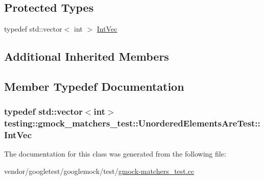 \subsection*{Protected Types}
\begin{DoxyCompactItemize}
\item 
typedef std\+::vector$<$ int $>$ \hyperlink{classtesting_1_1gmock__matchers__test_1_1UnorderedElementsAreTest_a608750c71652943bd11fe7bb5281588d}{Int\+Vec}
\end{DoxyCompactItemize}
\subsection*{Additional Inherited Members}


\subsection{Member Typedef Documentation}
\subsubsection[{\texorpdfstring{Int\+Vec}{IntVec}}]{\setlength{\rightskip}{0pt plus 5cm}typedef std\+::vector$<$int$>$ {\bf testing\+::gmock\+\_\+matchers\+\_\+test\+::\+Unordered\+Elements\+Are\+Test\+::\+Int\+Vec}\hspace{0.3cm}{\ttfamily [protected]}}\hypertarget{classtesting_1_1gmock__matchers__test_1_1UnorderedElementsAreTest_a608750c71652943bd11fe7bb5281588d}{}\label{classtesting_1_1gmock__matchers__test_1_1UnorderedElementsAreTest_a608750c71652943bd11fe7bb5281588d}


The documentation for this class was generated from the following file\+:\begin{DoxyCompactItemize}
\item 
vendor/googletest/googlemock/test/\hyperlink{gmock-matchers__test_8cc}{gmock-\/matchers\+\_\+test.\+cc}\end{DoxyCompactItemize}
